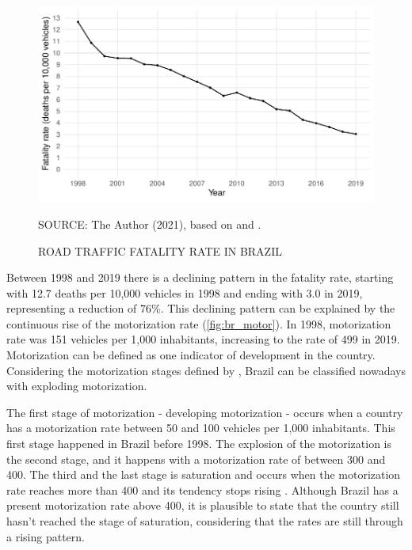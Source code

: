 \begin{figure}[!htbp]
    \centering\footnotesize
    \captionsetup{font=footnotesize}
    \caption{ROAD TRAFFIC FATALITY RATE IN BRAZIL}
    \includegraphics{fig/brazil_fatality.pdf}
    \label{fig:br_fatal}
    \par SOURCE: The Author (2021), based on \textcite{MinistryofHealth2020} and \textcite{DENATRAN2020}.
\end{figure}                                

Between 1998 and 2019 there is a declining pattern in the fatality rate, starting with 12.7 deaths per 10,000 vehicles in 1998 and ending with 3.0 in 2019, representing a reduction of 76\%. This declining pattern can be explained by the continuous rise of the motorization rate (\autoref{fig:br_motor}). In 1998, motorization rate was 151 vehicles per 1,000 inhabitants, increasing to the rate of 499 in 2019. Motorization can be defined as one indicator of development in the country. Considering the motorization stages defined by \textcite{Jorgensen2005}, Brazil can be classified nowadays with exploding motorization. 

The first stage of motorization - developing motorization - occurs when a country has a motorization rate between 50 and 100 vehicles per 1,000 inhabitants. This first stage happened in Brazil before 1998. The explosion of the motorization is the second stage, and it happens with a motorization rate of between 300 and 400. The third and the last stage is saturation and occurs when the motorization rate reaches more than 400 and its tendency stops rising \cite{Jorgensen2005}. Although Brazil has a present motorization rate above 400, it is plausible to state that the country still hasn't reached the stage of saturation, considering that the rates are still through a rising pattern. 

